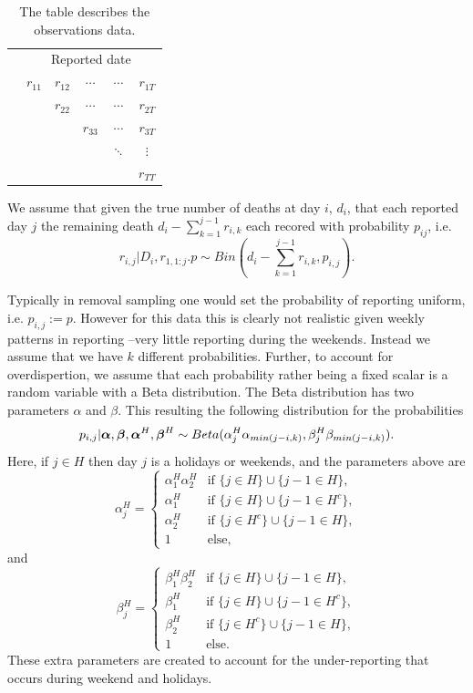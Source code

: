 \begin{table}
	\centering
	\begin{tabular}{cccccc}
		\multicolumn{1}{c}{} & \multicolumn{5}{c}{Reported date}                                             \\
		\parbox[t]{2mm}{}   & $r_{11}$ & $r_{12}$ & $\cdots$ &$\cdots$  &  $r_{1T}$\\
		& & $r_{22}$ &  $\cdots$ & $\cdots$   &$r_{2T}$ \\
		& & &$r_{33}$ &  $\cdots$ &  $r_{3T}$ \\
		& & & &  $\ddots$ & $\vdots$  \\
		& & & &  &  $r_{TT}$ \\

	\end{tabular}

	\caption{The table describes the observations data.}
	\label{tab:Data}
\end{table}

 We assume that given the true number of deaths at day $i$, $d_i$, that each reported day $j$ the remaining death $d_i - \sum_{k=1}^{j-1}r_{i,k}$ each recored with probability $p_{ij}$, i.e. $$r_{i,j}|D_i,r_{1,1:j}.p \sim Bin(d_i - \sum_{k=1}^{j-1}r_{i,k}, p_{i,j}).$$

Typically in removal sampling one would set the probability of reporting uniform, i.e. $p_{i,j}:=p$. However for this data this is clearly not realistic given weekly patterns in reporting --very little reporting during the weekends. Instead we assume that we have $k$ different probabilities. Further, to account for overdispertion, we assume that each probability rather being a fixed scalar is a random variable with a Beta distribution. The Beta distribution has two parameters $\alpha$ and $\beta$. This resulting the following distribution for the probabilities
$$
p_{i,j}| {\boldsymbol{\mathrm{\alpha}}},{\boldsymbol{\mathrm{\beta}}}, {\boldsymbol{\mathrm{\alpha}}}^H,{\boldsymbol{\mathrm{\beta}}}^H  \sim Beta(\alpha^H_j\alpha_{min(j-i,k)},\beta^H_j\beta_{min(j-i,k)}).
$$
Here, if $j\in H$ then day $j$ is a holidays or weekends, and the parameters above are
$$
\alpha^H_j = \begin{cases}
\alpha_1^H \alpha_2^H & \mbox{if }  \{j\in H \}\cup  \{j-1\in H \},  \\
\alpha_1^H & \mbox{if }  \{j\in H \}\cup  \{j-1\in H^c \}, \\
\alpha_2^H & \mbox{if }  \{j\in H^c \}\cup  \{j-1\in H \}, \\
1 & \mbox{else,}
\end{cases}
$$
and
$$
\beta^H_j = \begin{cases}
\beta_1^H \beta_2^H & \mbox{if }  \{j\in H \}\cup  \{j-1\in H \},  \\
\beta_1^H & \mbox{if }  \{j\in H \}\cup  \{j-1\in H^c \}, \\
\beta_2^H & \mbox{if }  \{j\in H^c \}\cup  \{j-1\in H \}, \\
1 & \mbox{else.}
\end{cases}
$$
These extra parameters are created to account for the under-reporting that occurs during weekend and holidays.


